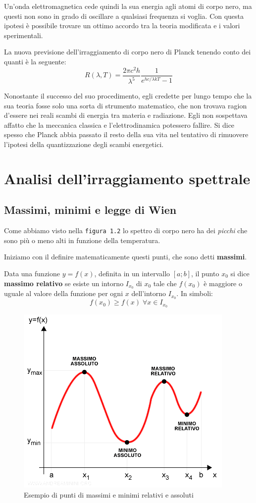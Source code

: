 \documentclass[12pt,twoside]{report}
\begin{document}
\par{Un'onda elettromagnetica cede quindi la sua energia agli atomi di corpo nero, ma questi non sono in grado di oscillare a qualsiasi frequenza si voglia. Con questa ipotesi è possibile trovare un ottimo accordo tra la teoria modificata e i valori sperimentali.}
\par{La nuova previsione dell'irraggiamento di corpo nero di Planck tenendo conto dei quanti è la seguente:}
$$ R(\lambda,T) = \frac{2\pi c^2h}{\lambda^5}\frac{1}{e^{hc/\lambda kT}-1} $$
\par{Nonostante il successo del suo procedimento, egli credette per lungo tempo che la sua teoria fosse solo una sorta di strumento matematico, che non trovava ragion d’essere nei reali scambi di energia tra materia e radiazione. Egli non sospettava affatto che la meccanica classica e l’elettrodinamica potessero fallire. Si dice spesso che Planck abbia passato il resto della sua vita nel tentativo di rimuovere l’ipotesi della quantizzazione degli scambi energetici.}

\chapter{Analisi dell'irraggiamento spettrale}
\section{Massimi, minimi e legge di Wien}
\par{Come abbiamo visto nella \texttt{figura 1.2} lo spettro di corpo nero ha dei \textit{picchi} che sono più o meno alti in funzione della temperatura.}
\par{Iniziamo con il definire matematicamente questi punti, che sono detti \textbf{massimi}.}

\begin{definition}
Data una funzione $y = f(x)$, definita in un intervallo $[a;b]$, il punto $x_0$ si dice \textbf{massimo relativo} se esiste un intorno $I_{x_0}$ di $x_0$ tale che $f(x_0)$ è maggiore o uguale al valore della funzione per ogni $x$ dell'intorno $I_{x_0}$.
In simboli: $$ f(x_0) \geq f(x) \; \forall x \in I_{x_0} $$
\end{definition}

\begin{figure}[!h]
\centering
\includegraphics[width = 0.5\hsize]{./figures/maxmin}
\caption{Esempio di punti di massimi e minimi relativi e assoluti}
\label{fig:logo}
\end{figure}
\end{document}

